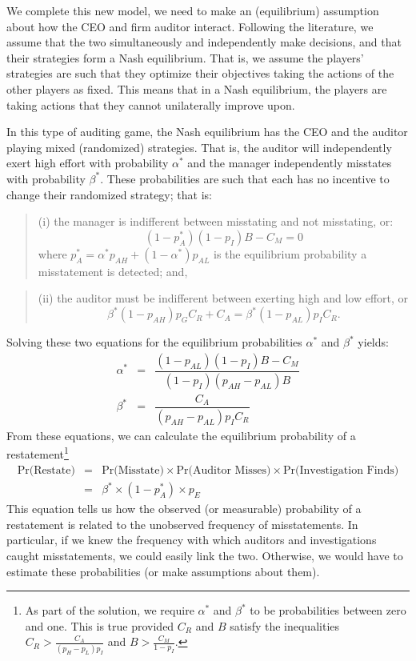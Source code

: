 We complete this new model, we need to make an (equilibrium) assumption about how the CEO and firm auditor interact. Following the literature, we assume that the two simultaneously
and independently make decisions, and that their strategies form a Nash equilibrium.
That is, we assume the players' strategies are such that they optimize their objectives 
taking the actions of the other players as fixed. This means that in a Nash equilibrium, 
the players are taking actions that they cannot unilaterally improve upon.

In this type of auditing game, the Nash equilibrium has the CEO and the auditor playing mixed (randomized) strategies.
That is, the auditor will independently exert high effort with probability $\alpha^*$ 
and the manager independently misstates with probability $\beta^*$. 
These probabilities 
are such that each has no incentive to change their randomized strategy; that is:
\begin{quote}
(i) the manager is indifferent between misstating and not misstating, or:
\begin{equation}\label{manager}
(1 - p_A^*)(1 - p_I) B - C_M = 0 
\end{equation}
where $p_A^* = \alpha^* p_{AH }+ (1-\alpha^*) p_{AL}$ is the equilibrium 
probability a misstatement is detected; and,
\end{quote}
\begin{quote} (ii) the auditor must be
indifferent between exerting high and low effort, or
$$ \beta^* (1-p_{AH}) p_G C_R + C_A = \beta^* (1-p_{AL}) p_I C_R .$$
\end{quote}

Solving these two equations for the equilibrium probabilities $\alpha^*$ and $\beta^*$
yields:
\begin{equation}\label{equilstrat}
\begin{array}{lcl}
  \alpha^* &= & \dfrac{ ( 1 - p_{AL}) (1 - p_I) B- C_M}{ (1 - p_I) (p_{AH}-p_{AL}) B}\\[1.5em]
  \beta^* &= & \dfrac{C_A}{(p_{AH}-p_{AL}) p_I C_R}  
\end{array}
\end{equation}
From these equations, we can calculate the equilibrium probability of a restatement\footnote{
As part of the solution, we require $\alpha^*$ and $\beta^*$ to be probabilities between
zero and one. 
This is true provided $C_R$ and $B$ satisfy the inequalities
$ C_R > \frac{C_A}{(p_H-p_L)p_I} $
and 
$ B > \frac{C_M}{1 - p_I}  $.}
\begin{equation} \label{equilpr1}
\begin{array}{lcl}
\mbox{Pr(Restate)} & = &  \mbox{Pr(Misstate)} \times \mbox{Pr(Auditor Misses)} \times
\mbox{Pr(Investigation Finds)}\\[1em]
& = & \beta^* \times (1-p_A^*) \times p_{E}
\end{array}\end{equation}
This equation tells us how the observed (or measurable) probability of a restatement is related to
the unobserved frequency of misstatements. In particular, if we knew the frequency with which auditors and investigations caught misstatements, we could easily link the two. Otherwise,
we would have to estimate these probabilities (or make assumptions about them).

